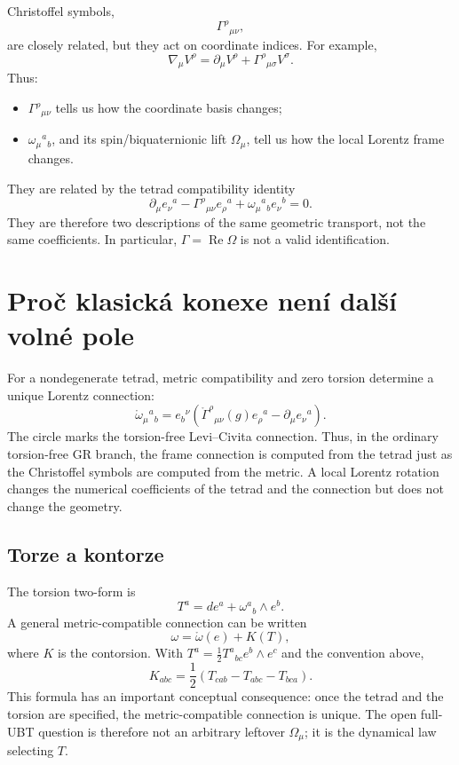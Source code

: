 Christoffel symbols,
\[
 \Gamma^\rho{}_{\mu\nu},
\]
are closely related, but they act on coordinate indices.  For example,
\[
 \nabla_\mu V^\rho=\partial_\mu V^\rho
 +\Gamma^\rho{}_{\mu\sigma}V^\sigma.
\]
Thus:
\begin{itemize}
 \item $\Gamma^\rho{}_{\mu\nu}$ tells us how the coordinate basis changes;
 \item $\omega_\mu{}^a{}_b$, and its spin/biquaternionic lift $\Omega_\mu$,
       tell us how the local Lorentz frame changes.
\end{itemize}
They are related by the tetrad compatibility identity
\[
 \partial_\mu e_\nu{}^a-\Gamma^\rho{}_{\mu\nu}e_\rho{}^a
 +\omega_\mu{}^a{}_b e_\nu{}^b=0.
\]
They are therefore two descriptions of the same geometric transport, not the
same coefficients.  In particular, $\Gamma=\operatorname{Re}\Omega$ is not a
valid identification.

\section{Proč klasická konexe není další volné pole}
For a nondegenerate tetrad, metric compatibility and zero torsion determine a
unique Lorentz connection:
\[
 \boxed{
 \mathring\omega_\mu{}^a{}_b
 =e_b{}^\nu\left(\mathring\Gamma^\rho{}_{\mu\nu}(g)e_\rho{}^a
 -\partial_\mu e_\nu{}^a\right).}
\]
The circle marks the torsion-free Levi--Civita connection.  Thus, in the
ordinary torsion-free GR branch, the frame connection is computed from the
tetrad just as the Christoffel symbols are computed from the metric.  A local
Lorentz rotation changes the numerical coefficients of the tetrad and the
connection but does not change the geometry.

\subsection{Torze a kontorze}
The torsion two-form is
\[
 T^a=de^a+\omega^a{}_b\wedge e^b.
\]
A general metric-compatible connection can be written
\[
 \boxed{\omega=\mathring\omega(e)+K(T),}
\]
where $K$ is the contorsion.  With
$T^a=\tfrac12T^a{}_{bc}e^b\wedge e^c$ and the convention above,
\[
 \boxed{
 K_{abc}=\frac12\left(T_{cab}-T_{abc}-T_{bca}\right).}
\]
This formula has an important conceptual consequence: once the tetrad and the
torsion are specified, the metric-compatible connection is unique.  The open
full-UBT question is therefore not an arbitrary leftover $\Omega_\mu$; it is
the dynamical law selecting $T$.

